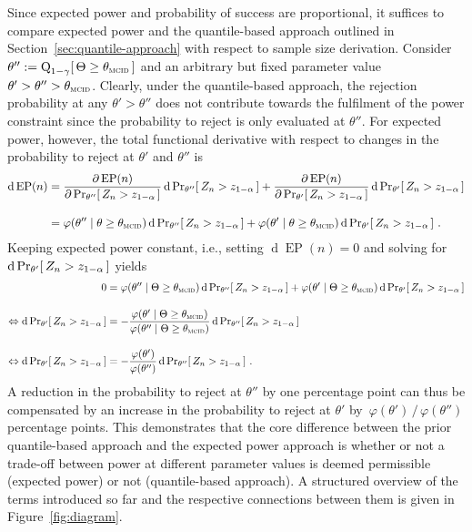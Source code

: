 \documentclass{article}
\renewcommand{\Pr}{\operatorname{Pr}}
\begin{document}
Since expected power and probability of success are proportional,
it suffices to compare expected power and the quantile-based approach outlined in Section~\ref{sec:quantile-approach} with respect to sample size derivation.
Consider
${\theta'' := \quant{1 - \gamma}[\, \Theta \geq \mcid \,]}$ and an arbitrary but fixed parameter value $\theta'>\theta'' >\mcid$.
Clearly, under the quantile-based approach, the rejection probability  at any $\theta'> \theta''$ does not contribute towards the fulfilment of the power constraint since the probability to reject is only evaluated at
${\theta''}$.
For expected power, however, the total functional derivative with respect to changes in the probability to reject at $\theta'$ and $\theta''$ is
\begin{align}
    \operatorname{d} \operatorname{EP}(n) &=
        \frac{\partial\operatorname{EP}(n)}{\partial\Pr_{\theta''}[\,Z_n > \criticalvalue\,]}\operatorname{d}\Pr_{\theta''}[\,Z_n > \criticalvalue\,] +
        \frac{\partial\operatorname{EP}(n)}{\partial\Pr_{\theta'}[\,Z_n > \criticalvalue\,]}\operatorname{d} \Pr_{\theta'}[\,Z_n > \criticalvalue\,] \\[1em]
        &= \varphi(\theta''\mid\theta \geq \mcid)\operatorname{d} \Pr_{\theta''}[\,Z_n > \criticalvalue\,] +
        \varphi(\theta'\mid\theta \geq \mcid)\operatorname{d} \Pr_{\theta'}[\,Z_n > \criticalvalue\,] \ .
\end{align}
Keeping expected power constant, i.e., setting ${\operatorname{d} \operatorname{EP}(n)=0}$ and solving for $\operatorname{d}\Pr_{\theta'}[\,Z_n > \criticalvalue\,]$  yields
\begin{align}
    0 &= \varphi(\theta''\mid\Theta \geq \mcid)\operatorname{d} \Pr_{\theta''}[\,Z_n > \criticalvalue\,] +
        \varphi(\theta'\mid\Theta \geq \mcid)\operatorname{d} \Pr_{\theta'}[\,Z_n > \criticalvalue\,] \\[1em]
    \Leftrightarrow \operatorname{d} \Pr_{\theta'}[\,Z_n > \criticalvalue\,] &= -\frac{\varphi(\theta'\mid\Theta \geq \mcid)}{\varphi(\theta''\mid\Theta \geq \mcid)} \operatorname{d} \Pr_{\theta''}[\,Z_n > \criticalvalue\,] \\[1em]
    \Leftrightarrow \operatorname{d} \Pr_{\theta'}[\,Z_n > \criticalvalue\,] &= -\frac{\varphi(\theta')}{\varphi(\theta'')} \operatorname{d} \Pr_{\theta''}[\,Z_n > \criticalvalue\,]
    \ .
\end{align}
A reduction in the probability to reject at $\theta''$ by one percentage point can thus be compensated by an increase in the probability to reject at $\theta'$ by~${\varphi(\theta')\,/\,\varphi(\theta'')}$ percentage points.
This demonstrates that the core difference between the prior quantile-based approach and the expected power approach is whether or not a trade-off between power at different parameter values is deemed permissible (expected power) or not (quantile-based approach).
A structured overview of the terms introduced so far and the respective connections between them is given in Figure~\ref{fig:diagram}.
\end{document}
